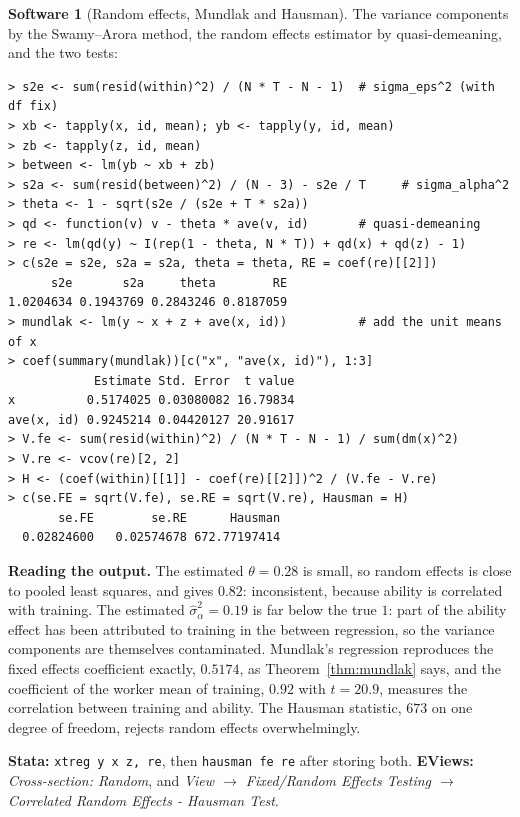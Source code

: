 \documentclass[11pt,a4paper]{article}
\numberwithin{equation}{section}
\theoremstyle{definition}
\newtheorem{software}[thm]{Software}
\begin{document}
\begin{software}[Random effects, Mundlak and Hausman]
\label{sw:panelre}
The variance components by the Swamy--Arora method, the random effects estimator by quasi-demeaning, and the two tests:
{\small\begin{verbatim}
> s2e <- sum(resid(within)^2) / (N * T - N - 1)  # sigma_eps^2 (with df fix)
> xb <- tapply(x, id, mean); yb <- tapply(y, id, mean)
> zb <- tapply(z, id, mean)
> between <- lm(yb ~ xb + zb)
> s2a <- sum(resid(between)^2) / (N - 3) - s2e / T     # sigma_alpha^2
> theta <- 1 - sqrt(s2e / (s2e + T * s2a))
> qd <- function(v) v - theta * ave(v, id)       # quasi-demeaning
> re <- lm(qd(y) ~ I(rep(1 - theta, N * T)) + qd(x) + qd(z) - 1)
> c(s2e = s2e, s2a = s2a, theta = theta, RE = coef(re)[[2]])
      s2e       s2a     theta        RE 
1.0204634 0.1943769 0.2843246 0.8187059 
> mundlak <- lm(y ~ x + z + ave(x, id))          # add the unit means of x
> coef(summary(mundlak))[c("x", "ave(x, id)"), 1:3]
            Estimate Std. Error  t value
x          0.5174025 0.03080082 16.79834
ave(x, id) 0.9245214 0.04420127 20.91617
> V.fe <- sum(resid(within)^2) / (N * T - N - 1) / sum(dm(x)^2)
> V.re <- vcov(re)[2, 2]
> H <- (coef(within)[[1]] - coef(re)[[2]])^2 / (V.fe - V.re)
> c(se.FE = sqrt(V.fe), se.RE = sqrt(V.re), Hausman = H)
       se.FE        se.RE      Hausman 
  0.02824600   0.02574678 672.77197414 
\end{verbatim}}
\textbf{Reading the output.} The estimated $\theta = 0.28$ is small, so random effects is close to pooled least squares, and gives $0.82$: inconsistent, because ability is
correlated with training. The estimated $\hat\sigma_\alpha^2 = 0.19$ is far below the true $1$: part of the ability effect has been attributed to training in the between
regression, so the variance components are themselves contaminated. Mundlak's regression reproduces the fixed effects coefficient exactly, $0.5174$, as
Theorem~\ref{thm:mundlak} says, and the coefficient of the worker mean of training, $0.92$ with $t = 20.9$, measures the correlation between training and ability. The
Hausman statistic, $673$ on one degree of freedom, rejects random effects overwhelmingly.

\textbf{Stata:} \texttt{xtreg y x z, re}, then \texttt{hausman fe re} after storing both. \textbf{EViews:} \emph{Cross-section: Random}, and \emph{View $\to$ Fixed/Random
Effects Testing $\to$ Correlated Random Effects - Hausman Test}.
\end{software}
\end{document}

